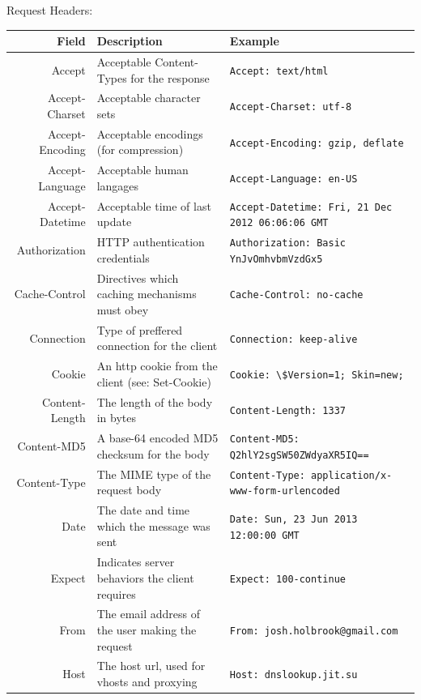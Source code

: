 \documentclass[final]{beamer}
\newcommand{\header}[1]{\texttt{\lstinline!#1!}}
\begin{document}
\begin{frame}{}
\begin{columns}
\begin{column}{0.4\textwidth}
\begin{block}{\huge{Request Headers:}}
          \footnotesize
          \begin{tabular}{r p{} p{}}
            Field & Description & Example \\ \hline
            Accept & Acceptable Content-Types for the response & \header{Accept: text/html } \\
            Accept-Charset & Acceptable character sets & \header{Accept-Charset: utf-8 } \\
            Accept-Encoding & Acceptable encodings (for compression) & \header{Accept-Encoding: gzip, deflate } \\
            Accept-Language & Acceptable human langages & \header{Accept-Language: en-US } \\
            Accept-Datetime & Acceptable time of last update & \header{Accept-Datetime: Fri, 21 Dec 2012 06:06:06 GMT } \\
            Authorization & HTTP authentication credentials & \header{Authorization: Basic YnJvOmhvbmVzdGx5 } \\
            Cache-Control & Directives which caching mechanisms must obey & \header{Cache-Control: no-cache } \\
            Connection & Type of preffered connection for the client & \header{Connection: keep-alive } \\
            Cookie & An http cookie from the client (see: Set-Cookie) & \header{Cookie: \$Version=1; Skin=new; } \\
            Content-Length & The length of the body in bytes & \header{Content-Length: 1337 } \\
            Content-MD5 & A base-64 encoded MD5 checksum for the body & \header{Content-MD5: Q2hlY2sgSW50ZWdyaXR5IQ== } \\
            Content-Type & The MIME type of the request body & \header{Content-Type: application/x-www-form-urlencoded } \\
            Date & The date and time which the message was sent & \header{Date: Sun, 23 Jun 2013 12:00:00 GMT } \\
            Expect & Indicates server behaviors the client requires & \header{Expect: 100-continue } \\
            From & The email address of the user making the request & \header{From: josh.holbrook@gmail.com } \\
            Host & The host url, used for vhosts and proxying & \header{Host: dnslookup.jit.su } \\

\end{tabular}
\end{block}
\end{column}
\end{columns}
\end{frame}
\end{document}
